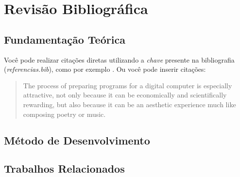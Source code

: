\chapter{Revisão Bibliográfica}\par
\lipsum[1]
\section{Fundamentação Teórica}
Você pode realizar citações diretas utilizando a \emph{chave} presente na bibliografia (\emph{referencias.bib}), como por exemplo \cite{turing}. Ou você pode inserir citações:

\begin{quote}
    The process of preparing programs for a digital computer is especially attractive, not only because it can be economically and scientifically rewarding, but also because it can be an aesthetic experience much like composing poetry or music.
    
\end{quote}

\section{Método de Desenvolvimento}
\lipsum[1]
\section{Trabalhos Relacionados}
\lipsum[1]